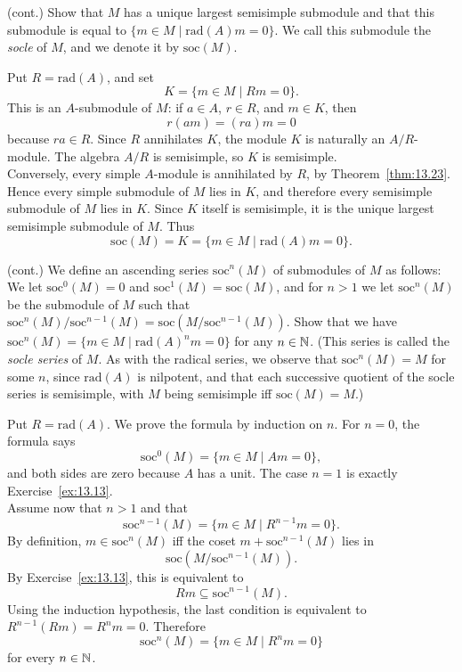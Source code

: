 \documentclass[../Odyssey_Project.tex]{subfiles}
\begin{document}
\begin{exercise}
\label{ex:13.13}
(cont.) Show that $M$ has a unique largest semisimple submodule and that this submodule is equal to $\{m \in M \mid \mathrm{rad}(A)m = 0\}$. We call this submodule the \emph{socle} of $M$, and we denote it by $\mathrm{soc}(M)$.
\end{exercise}
\begin{solution}
    Put $R=\mathrm{rad}(A)$, and set
    \[
        K=\{m\in M\mid Rm=0\}.
    \]
    This is an $A$-submodule of $M$: if $a\in A$, $r\in R$, and $m\in K$, then
    \[
        r(am)=(ra)m=0
    \]
    because $ra\in R$. Since $R$ annihilates $K$, the module $K$ is naturally an $A/R$-module. The algebra $A/R$ is semisimple, so $K$ is semisimple.\\
    Conversely, every simple $A$-module is annihilated by $R$, by Theorem~\ref{thm:13.23}. Hence every simple submodule of $M$ lies in $K$, and therefore every semisimple submodule of $M$ lies in $K$. Since $K$ itself is semisimple, it is the unique largest semisimple submodule of $M$. Thus
    \[
        \mathrm{soc}(M)=K=\{m\in M\mid \mathrm{rad}(A)m=0\}.
    \]
\end{solution}

\begin{exercise}
\label{ex:13.14}
(cont.) We define an ascending series $\mathrm{soc}^n(M)$ of submodules of $M$ as follows: We let $\mathrm{soc}^0(M) = 0$ and $\mathrm{soc}^1(M) = \mathrm{soc}(M)$, and for $n > 1$ we let $\mathrm{soc}^n(M)$ be the submodule of $M$ such that $\mathrm{soc}^n(M)/\mathrm{soc}^{n-1}(M) = \mathrm{soc}(M/\mathrm{soc}^{n-1}(M))$. Show that we have $\mathrm{soc}^n(M) = \{m \in M \mid \mathrm{rad}(A)^n m = 0\}$ for any $n \in \mathbb{N}$. (This series is called the \emph{socle series} of $M$. As with the radical series, we observe that $\mathrm{soc}^n(M) = M$ for some $n$, since $\mathrm{rad}(A)$ is nilpotent, and that each successive quotient of the socle series is semisimple, with $M$ being semisimple iff $\mathrm{soc}(M) = M$.)
\end{exercise}
\begin{solution}
    Put $R=\mathrm{rad}(A)$. We prove the formula by induction on $n$. For $n=0$, the formula says
    \[
        \mathrm{soc}^0(M)=\{m\in M\mid A m=0\},
    \]
    and both sides are zero because $A$ has a unit. The case $n=1$ is exactly Exercise~\ref{ex:13.13}.\\
    Assume now that $n>1$ and that
    \[
        \mathrm{soc}^{n-1}(M)=\{m\in M\mid R^{n-1}m=0\}.
    \]
    By definition, $m\in \mathrm{soc}^n(M)$ iff the coset $m+\mathrm{soc}^{n-1}(M)$ lies in
    \[
        \mathrm{soc}(M/\mathrm{soc}^{n-1}(M)).
    \]
    By Exercise~\ref{ex:13.13}, this is equivalent to
    \[
        Rm\subseteq \mathrm{soc}^{n-1}(M).
    \]
    Using the induction hypothesis, the last condition is equivalent to $R^{n-1}(Rm)=R^n m=0$. Therefore
    \[
        \mathrm{soc}^n(M)=\{m\in M\mid R^n m=0\}
    \]
    for every $n\in\mathbb{N}$.
\end{solution}
\end{document}
